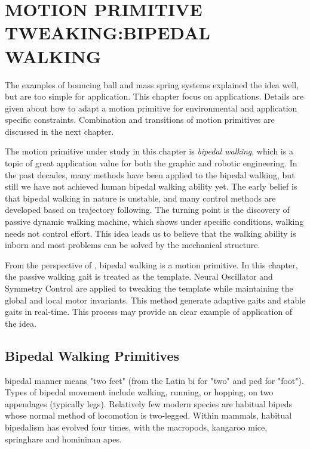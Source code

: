\chapter{MOTION PRIMITIVE TWEAKING:BIPEDAL WALKING}
\label{chap:walk}
\graphicspath{{BipedWalk/BipedWalkFigs/EPS/}{BipedWalk/BipedWalkFigs/}}


The examples of bouncing ball and mass spring systems explained the idea well, but are too simple for \cms application.
This chapter focus on applications.  
Details are given about how to adapt a motion primitive for  environmental and application specific constraints.
Combination and transitions of motion primitives are discussed in the next chapter.


The motion primitive under study in this chapter is \emph{bipedal walking}, which is a topic of great application value for both the graphic and robotic engineering.
In the past decades, many methods have been applied to the bipedal walking, but still we have not achieved  human bipedal walking ability yet.
The early belief is that bipedal walking in nature is unstable, and many control methods are developed based on trajectory following.
The turning point is the discovery of passive dynamic walking machine, which shows under specific conditions, walking needs not control effort.
This idea leads us to believe that the walking ability is inborn and most problems can be solved by the mechanical structure.

From the perspective of \moit, bipedal walking is  a motion primitive.
In this chapter, the passive walking gait is treated as the template.
Neural Oscillator and Symmetry Control are applied to tweaking the template while maintaining the global and local motor invariants.
This method generate adaptive gaits and stable gaits in real-time.
This process may provide an clear example of application of the \moit idea.




\section{Bipedal Walking Primitives}


bipedal manner means "two feet" (from the Latin bi for "two" and ped for "foot"). 
Types of bipedal movement include walking, running, or hopping, on two appendages (typically legs).
Relatively few modern species are habitual bipeds whose normal method of locomotion is two-legged. 
Within mammals, habitual bipedalism has evolved four times, with the macropods, kangaroo mice, springhare and homininan apes. 

